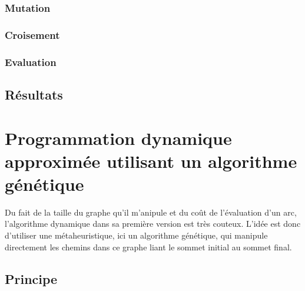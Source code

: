 \documentclass[a4paper]{report}
\begin{document}
 \subsubsection*{Mutation}
 \subsubsection*{Croisement}
 \subsubsection*{Evaluation}
\subsection{Résultats}
\section{Programmation dynamique approximée utilisant un algorithme génétique}
Du fait de la taille du graphe qu'il m'anipule et du coût de l'évaluation d'un arc, l'algorithme dynamique dans sa première version est très couteux.  L'idée est donc d'utiliser une métaheuristique, ici un algorithme génétique, qui manipule directement les chemins dans ce graphe liant le sommet initial au sommet final.\\

\subsection{Principe}
\end{document}
